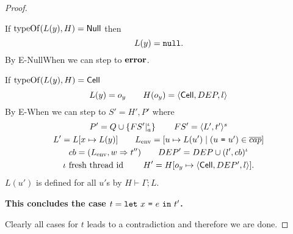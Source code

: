 \begin{proof}
\begin{description}
\begin{description}
          If $\mbox{$\mathrm{typeOf}$}(L(y), H) = \mbox{$\mathsf{Null}$}$ then
          \begin{equation*}
            L(y) = \mbox{\mdseries\texttt{null}}.
          \end{equation*}
          By {\sc E-NullWhen} we can step to $\mbox{{\bf error}}$. \contradiction

          If $\mbox{$\mathrm{typeOf}$}(L(y), H) = \mbox{$\mathsf{Cell}$}$
          \begin{equation*}
            L(y) = o_y  \quad\quad H(o_y) = \mbox{$\langle \mbox{$\mathsf{Cell}$}{}, DEP, l \rangle$}
          \end{equation*}
          By {\sc E-When} we can step to $S' = H', P'$ where
          \begin{equation*}
            \begin{gathered}
              P' = Q \cup \left\{FS'|_a^\iota \right\} \quad\quad FS' = \mbox{$\langle L',
              t' \rangle^s$} \\
              L' = L[x \mapsto L(y)] \quad\quad L_{\text{env}} = [u \mapsto L(u')
              \mid
              (\mbox{\mdseries$u$~\texttt{=}~$u'$}) \in \overline{cap}] \\
              cb = ( L_{\text{env}}, w \Rightarrow t'' ) \quad\quad DEP' = DEP
              \cup (l', cb)^\iota \\
              \iota \text{ fresh thread id } \quad\quad H' = H[o_y \mapsto \mbox{$\langle \mbox{$\mathsf{Cell}$}{}, DEP',
              l \rangle$}].
            \end{gathered}
          \end{equation*}
          $L(u')$ is defined for all $u'$s by $H \vdash \Gamma; L$. \contradiction
      \end{description}
      {\bf This concludes the case $t = \mbox{\mdseries\texttt{let}~$x$~\texttt{=}~$e$~\texttt{in}~$t'$}$.}
  \end{description}
  Clearly all cases for $t$ leads to a contradiction and therefore we are done.
\end{proof}


